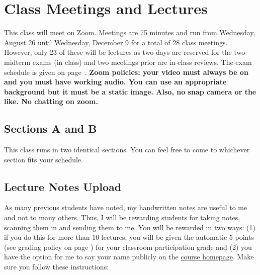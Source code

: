 \documentclass[12pt]{article}
\newcommand{\coursewebpage}{\href{https://github.com/kapelner/QC_Math_621_Fall_2020}{course homepage}}
\begin{document}
\section*{Class Meetings and Lectures}

This class will meet on Zoom. Meetings are 75 minutes and run from Wednesday, August 26 until Wednesday, December 9 for a total of 28 class meetings. However, only 23 of these will be lectures as two days are reserved for the two midterm exams (in class) and two meetings prior are in-class reviews. The exam schedule is given on page~\pageref{subsec:exam_schedule}. \textbf{Zoom policies: your video must always be on and you must have working audio. You can use an appropriate background but it must be a static image. Also, no snap camera or the like. No chatting on zoom.}

\subsection*{Sections A and B}

This class runs in two identical sections. You can feel free to come to whichever section fits your schedule.

%

\subsection*{Lecture Notes Upload}

As many previous students have noted, my handwritten notes are useful to me and not to many others. Thus, I will be rewarding students for taking notes, scanning them in and sending them to me. You will be rewarded in two ways: (1) if you do this for more than 10 lectures, you will be given the automatic 5 points (see grading policy on page \pageref{sec:grading}) for your classroom participation grade and (2) you have the option for me to say your name publicly on the \coursewebpage. Make sure you follow these instructions:
\end{document}
